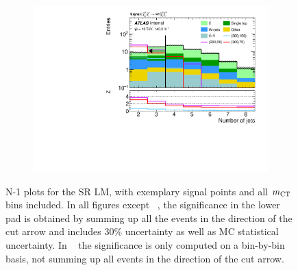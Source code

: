\begin{figure}
\begin{subfigure}[b]{0.4\linewidth}
		\caption{\label{fig:Wh_reopt_second_round_n1_srlm_mlb1}}
	\end{subfigure}%
	\begin{subfigure}[b]{0.4\linewidth}
		\centering\includegraphics[width=\textwidth]{n1_SRLM_mct_bins/nJet30.pdf}
		\caption{\label{fig:Wh_reopt_second_round_n1_srlm_njet}}
	\end{subfigure}
	\caption{N-1 plots for the SR LM, with exemplary signal points and all $m_{\textrm{CT}}$ bins included. In all figures except \figname~, the significance in the lower pad is obtained by summing up all the events in the direction of the cut arrow and includes 30\% uncertainty as well as MC statistical uncertainty. In \figname~ the significance is only computed on a bin-by-bin basis, \ie not summing up all events in the direction of the cut arrow.}
	\label{fig:Wh_reopt_second_round_n1_srlm}
\end{figure}

